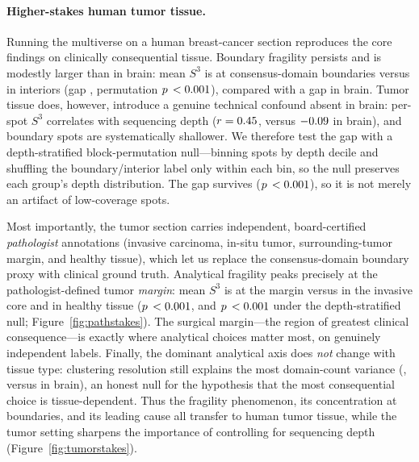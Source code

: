 \paragraph{Higher-stakes human tumor tissue.} Running the multiverse on a human breast-cancer
section reproduces the core findings on clinically consequential tissue. Boundary fragility
persists and is modestly larger than in brain: mean $S^3$ is \TumorBoundaryS{} at
consensus-domain boundaries versus \TumorInteriorS{} in interiors (gap \TumorGap{}, permutation
$p\,<0.001{}$), compared with a \StakesGap{} gap in brain. Tumor tissue does, however,
introduce a genuine technical confound absent in brain: per-spot $S^3$ correlates with
sequencing depth ($r=0.45{}$, versus $-0.09{}$ in brain), and boundary spots are
systematically shallower. We therefore test the gap with a depth-stratified block-permutation
null---binning spots by depth decile and shuffling the boundary/interior label only within each
bin, so the null preserves each group's depth distribution. The gap survives
($p\,<0.001{}$), so it is not merely an artifact of low-coverage spots.

Most importantly, the tumor section carries independent, board-certified \emph{pathologist}
annotations (invasive carcinoma, in-situ tumor, surrounding-tumor margin, and healthy tissue),
which let us replace the consensus-domain boundary proxy with clinical ground truth. Analytical
fragility peaks precisely at the pathologist-defined tumor \emph{margin}: mean $S^3$ is
\PathMarginS{} at the margin versus \PathInvasiveS{} in the invasive core and \PathHealthyS{}
in healthy tissue ($p\,<0.001{}$, and $p\,<0.001{}$ under the depth-stratified null;
Figure~\ref{fig:pathstakes}). The surgical margin---the region of greatest clinical
consequence---is exactly where analytical choices matter most, on genuinely independent labels.
Finally, the
dominant analytical axis does \emph{not} change with tissue type: clustering resolution still
explains the most domain-count variance (\TumorVarTopFrac{}, versus \VarTopFrac{} in brain),
an honest null for the hypothesis that the most consequential choice is tissue-dependent. Thus
the fragility phenomenon, its concentration at boundaries, and its leading cause all transfer
to human tumor tissue, while the tumor setting sharpens the importance of controlling for
sequencing depth (Figure~\ref{fig:tumorstakes}).

